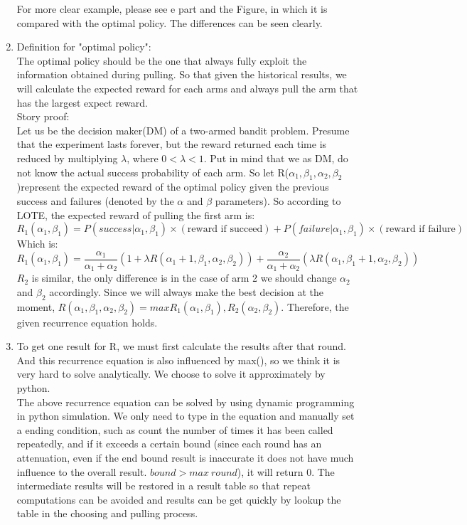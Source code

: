 \documentclass{article}
\begin{document}
\begin{homeworkProblem}
\begin{enumerate}[1.]
        For more clear example, please see e part and the Figure, in which it is compared with the optimal policy. The differences can be seen clearly.
        \item
        Definition for "optimal policy":\\
        The optimal policy should be the one that always fully exploit the information obtained during pulling. So that given the historical results, we will calculate the expected reward for each arms and always pull the arm that has the largest expect reward.\\
        Story proof:\\
        Let us be the decision maker(DM) of a two-armed bandit problem. Presume that the experiment lasts forever, 
        but the reward returned each time is reduced by multiplying $\lambda$, where $0<\lambda<1$. Put in mind that we as DM, 
        do not know the actual success probability of each arm. So let R($\alpha_1,\beta_1,\alpha_2,\beta_2$)represent the expected reward of the optimal policy given the previous success and failures (denoted by the $\alpha$ and $\beta$ parameters).
        So according to LOTE, the expected reward of pulling the first arm is:
        $$R_1(\alpha_1,\beta_1) = P(success|\alpha_1,\beta_1)\times(\text{reward if succeed})+P(failure|\alpha_1,\beta_1)\times(\text{reward if failure})$$
        Which is:
        $$R_1(\alpha_1,\beta_1) = \frac{\alpha_1}{\alpha_1+\alpha_2}(1+\lambda R(\alpha_1+1,\beta_1,\alpha_2,\beta_2))+\frac{\alpha_2}{\alpha_1+\alpha_2}(\lambda R(\alpha_1,\beta_1+1,\alpha_2,\beta_2))$$
        $R_2$ is similar, the only difference is in the case of arm 2 we should change $\alpha_2$ and $\beta_2$ accordingly.
        Since we will always make the best decision at the moment, $R(\alpha_1,\beta_1,\alpha_2,\beta_2) = max{R_1(\alpha_1,\beta_1),R_2(\alpha_2,\beta_2)}$.
        Therefore, the given recurrence equation holds.
        \item
        To get one result for R, we must first calculate the results after that round. And this recurrence equation is also influenced by max(), so we think it is very hard to solve analytically. We choose to solve it approximately by python.\\
        The above recurrence equation can be solved by using dynamic programming in python simulation. We only need to type in the equation and manually set a ending condition,
        such as count the number of times it has been called repeatedly, and if it exceeds a certain bound (since each round has an attenuation, even if the end bound result is inaccurate it does not have much influence to the overall result. $bound>max~round$), it will return 0. The intermediate results will be restored in a result table so that repeat computations can be avoided and results can be get quickly by lookup the table in the choosing and pulling process.

\end{enumerate}
\end{homeworkProblem}
\end{document}
